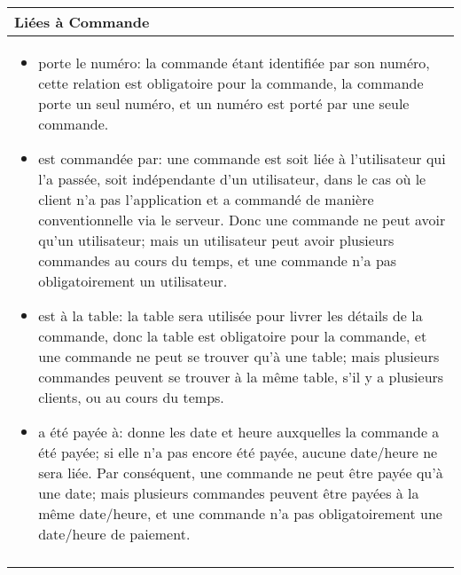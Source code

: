 \documentclass[a4paper,10pt]{article}
\begin{document}
\begin{tabu}{X}
\textbf{Liées à Commande}\\
\toprule

\begin{itemize}
    \item porte le numéro: la commande étant identifiée par son numéro, cette relation est obligatoire pour la commande, la commande porte un seul numéro, et un numéro est porté par une seule commande.
    \item est commandée par: une commande est soit liée à l'utilisateur qui l'a passée, soit indépendante d'un utilisateur, dans le cas où le client n'a pas l'application et a commandé de manière conventionnelle via le serveur. Donc une commande ne peut avoir qu'un utilisateur; mais un utilisateur peut avoir plusieurs commandes au cours du temps, et une commande n'a pas obligatoirement un utilisateur.
    \item est à la table: la table sera utilisée pour livrer les détails de la commande, donc la table est obligatoire pour la commande, et une commande ne peut se trouver qu'à une table; mais plusieurs commandes peuvent se trouver à la même table, s'il y a plusieurs clients, ou au cours du temps.
    \item a été payée à: donne les date et heure auxquelles la commande a été payée; si elle n'a pas encore été payée, aucune date/heure ne sera liée. Par conséquent, une commande ne peut être payée qu'à une date; mais plusieurs commandes peuvent être payées à la même date/heure, et une commande n'a pas obligatoirement une date/heure de paiement.
\end{itemize}
\\\\
\end{tabu}
\end{document}
